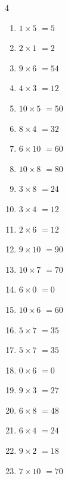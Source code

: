 \begin{multicols}{4}
\begin{enumerate}
  \item $1\times 5$
        $=5$

  \item $2\times 1$
        $=2$

  \item $9\times 6$
        $=54$

  \item $4\times 3$
        $=12$

  \item $10\times 5$
        $=50$

  \item $8\times 4$
        $=32$

  \item $6\times 10$
        $=60$

  \item $10\times 8$
        $=80$

  \item $3\times 8$
        $=24$

  \item $3\times 4$
        $=12$

  \item $2\times 6$
        $=12$

  \item $9\times 10$
        $=90$

  \item $10\times 7$
        $=70$

  \item $6\times 0$
        $=0$

  \item $10\times 6$
        $=60$

  \item $5\times 7$
        $=35$

  \item $5\times 7$
        $=35$

  \item $0\times 6$
        $=0$

  \item $9\times 3$
        $=27$

\columnbreak %

  \item $6\times 8$
        $=48$

  \item $6\times 4$
        $=24$

  \item $9\times 2$
        $=18$

  \item $7\times 10$
        $=70$


\end{enumerate}
\end{multicols}
